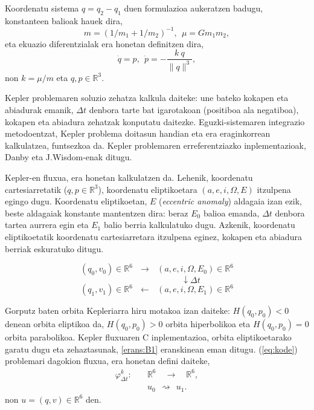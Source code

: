 Koordenatu sistema $q=q_2-q_1$ duen formulazioa aukeratzen badugu, konstanteen balioak hauek dira,  
\begin{equation*}
m=(1/m_1+1/m_2)^{-1},\ \ \mu=Gm_1m_2,
\end{equation*} 
%
eta ekuazio diferentzialak era honetan definitzen dira,
\begin{equation}
\label{eq:kode}
\dot{q}=p, \ \ \dot{p}= - \frac{k \ q}{\|q\|^3} ,
\end{equation}
non $k= \mu / m$ eta  $q,p \in \mathbb{R}^3$.

Kepler problemaren soluzio zehatza kalkula daiteke: une bateko kokapen eta abiadurak emanik, $\Delta t$ denbora tarte bat igarotakoan (positiboa ala negatiboa), kokapen eta abiadura zehatzak konputatu daitezke. Eguzki-sistemaren integrazio metodoentzat, Kepler problema doitasun handian eta era eraginkorrean kalkulatzea, funtsezkoa da. Kepler problemaren erreferentziazko inplementazioak, Danby \cite{Danby1992} eta J.Wisdom-enak  \cite{Wisdom2015} ditugu. 

Kepler-en fluxua, era honetan kalkulatzen da. Lehenik, koordenatu cartesiarretatik ($q,p\in \mathbb{R}^3$), koordenatu eliptikoetara $(a,e,i,\Omega,E)$ itzulpena egingo dugu. Koordenatu eliptikoetan, $E$ (\emph{eccentric anomaly}) aldagaia izan ezik, beste aldagaiak konstante mantentzen dira: beraz $E_0$ balioa emanda, $\Delta t$ denbora tartea aurrera egin eta $E_1$ balio berria kalkulatuko dugu. Azkenik, koordenatu eliptikoetatik koordenatu cartesiarretara itzulpena eginez, kokapen eta abiadura berriak eskuratuko ditugu. 

\begin{equation*}
(q_0,v_0) \in \mathbb{R}^6 \ \ \ \longrightarrow \ \ \  (a,e,i,\Omega,E_0) \in \mathbb{R}^6 
\end{equation*}
\begin{equation*}
\quad \quad \quad \quad \quad \quad \quad \quad \downarrow \Delta t
\end{equation*}
\begin{equation*}
(q_1,v_1) \in \mathbb{R}^6 \ \ \ \longleftarrow \ \ \  (a,e,i,\Omega,E_1) \in \mathbb{R}^6 
\end{equation*}

Gorputz baten orbita Kepleriarra hiru motakoa izan daiteke: $H(q_0,p_0)<0$ denean orbita eliptikoa da, $H(q_0,p_0)>0$ orbita hiperbolikoa eta $H(q_0,p_0)=0$ orbita  parabolikoa. Kepler fluxuaren C inplementazioa, orbita eliptikoetarako garatu dugu eta zehaztasunak, \ref{erans:B1} eranskinean eman ditugu. (\ref{eq:kode}) problemari dagokion fluxua, era honetan defini daiteke,
\begin{align*}
\varphi_{\Delta t}^k:&  \quad \mathbb{R}^{6} \quad  \longrightarrow \quad \mathbb{R}^6,  \\
&  \quad u_0 \ \  \rightsquigarrow \ \ u_1. 
\end{align*} 
non $u=(q,v) \in \mathbb{R}^6$  den.

